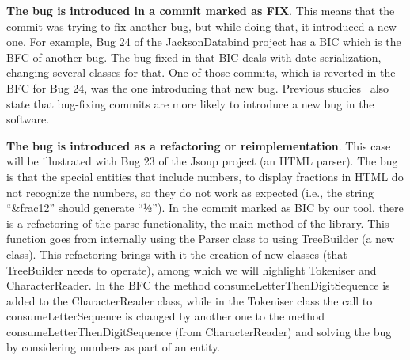 \begin{inparaenum}[\bf(1)]
\item \textbf{The bug is introduced in a commit marked as FIX}. 
This means that the commit was trying to fix another bug, but while doing that, it introduced a new one. For example, Bug 24 of the JacksonDatabind project has a BIC which is the BFC of another bug. 
The bug fixed in that BIC deals with date serialization, changing several classes for that. 
One of those commits, which is reverted in the BFC for Bug 24, was the one introducing that new bug.
Previous studies~\cite{guo2010characterizing,purushothaman2005toward,yin2011fixes} also state that bug-fixing commits are more likely to introduce a new bug in the software.

\item \textbf{The bug is introduced as a refactoring or reimplementation}. 
This case will be illustrated with Bug 23 of the Jsoup project (an HTML parser).
The bug is that the special entities that include numbers, to display fractions in HTML do not recognize the numbers, so they do not work as expected  (i.e., the string ``\&frac12'' should generate ``½'').
In the commit marked as BIC by our tool, there is a refactoring of the parse functionality, the main method of the library. 
This function goes from internally using the Parser class to using TreeBuilder (a new class). 
This refactoring brings with it the creation of new classes (that TreeBuilder needs to operate), among which we will highlight Tokeniser and CharacterReader.
In the BFC the method consumeLetterThenDigitSequence is added to the CharacterReader class, while in the Tokeniser class the call to consumeLetterSequence is changed by another one to the method consumeLetterThenDigitSequence (from CharacterReader) and solving the bug by considering numbers as part of an entity.

\end{inparaenum}

